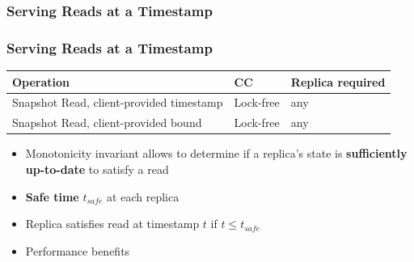 \documentclass{beamer}
\begin{document}
\subsubsection{Serving Reads at a Timestamp}
\begin{frame}
  \frametitle{Serving Reads at a Timestamp}
  \begin{center}
    {\footnotesize
    \begin{tabular}{|l||l|l|}
      \hline
      Operation & CC & Replica required\tabularnewline
      \hline\hline
      Snapshot Read, client-provided timestamp & Lock-free & any\tabularnewline
      \hline
      Snapshot Read, client-provided bound & Lock-free & any \tabularnewline
      \hline
    \end{tabular}
    }
  \end{center}
  \begin{itemize}
    \item{Monotonicity invariant allows to determine if a replica's state is
      \textbf{sufficiently up-to-date} to satisfy a read
    }
    \item{\textbf{Safe time} $t_{safe}$ at each replica}
    \item{Replica satisfies read at timestamp $t$ if $t \leq t_{safe}$}
    \item{Performance benefits}
  \end{itemize}
\end{frame}

\end{document}

